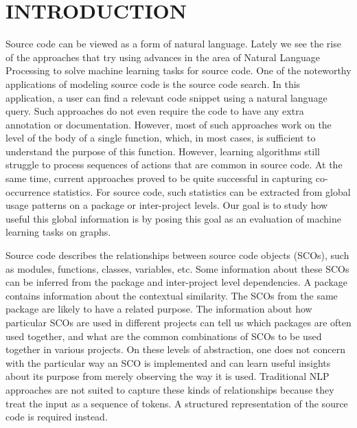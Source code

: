 \documentclass[a4paper,twoside]{article}
\begin{document}
\section{\uppercase{Introduction}}
Source code can be viewed as a form of natural language. Lately we see the rise of the approaches that try using advances in the area of Natural Language Processing to solve machine learning tasks for source code. One of the noteworthy applications of modeling source code is the source code search. In this application, a user can find a relevant code snippet using a natural language query. Such approaches do not even require the code to have any extra annotation or documentation. However, most of such approaches work on the level of the body of a single function, which, in most cases, is sufficient to understand the purpose of this function. However, learning algorithms still struggle to process sequences of actions that are common in source code. At the same time, current approaches proved to be quite successful in capturing co-occurrence statistics. For source code, such statistics can be extracted from global usage patterns on a package or inter-project levels. Our goal is to study how useful this global information is by posing this goal as an evaluation of machine learning tasks on graphs.
 
Source code describes the relationships between source code objects (SCOs), such as modules, functions, classes, variables, etc. Some information about these SCOs can be inferred from the package and inter-project level dependencies. A package contains information about the contextual similarity. The SCOs from the same package are likely to have a related purpose. The information about how particular SCOs are used in different projects can tell us which packages are often used together, and what are the common combinations of SCOs to be used together in various projects. On these levels of abstraction, one does not concern with the particular way an SCO is implemented and can learn useful insights about its purpose from merely observing the way it is used. Traditional NLP approaches are not suited to capture these kinds of relationships because they treat the input as a sequence of tokens. A structured representation of the source code is required instead.
\end{document}
